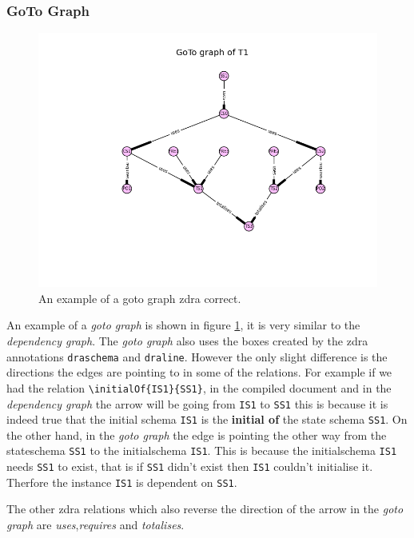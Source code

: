 \subsubsection{GoTo Graph}

\begin{figure}[H]
\centering
\includegraphics[scale=0.5]{Figures/zdra/gotograph.png}
\caption{An example of a goto graph \gls{zdra} correct. \label{fig:gotograph}}
\end{figure}

An example of a \emph{goto graph} is shown in figure \ref{fig:gotograph}, it is very similar to the \emph{dependency graph}. The \emph{goto graph} also uses the boxes created by the \gls{zdra} annotations \verb|draschema| and \verb|draline|. However the only slight difference is the directions the edges are pointing to in some of the relations. For example if we had the relation \verb|\initialOf{IS1}{SS1}|, in the compiled document and in the \emph{dependency graph} the arrow will be going from \verb|IS1| to \verb|SS1| this is because it is indeed true that the initial schema \verb|IS1| is the \textbf{initial of} the state schema \verb|SS1|. On the other hand, in the \emph{goto graph} the edge is pointing the other way from the stateschema \verb|SS1| to the initialschema \verb|IS1|. This is because the initialschema \verb|IS1| needs \verb|SS1| to exist, that is if \verb|SS1| didn't exist then \verb|IS1| couldn't initialise it. Therfore the instance \verb|IS1| is dependent on \verb|SS1|.

The other \gls{zdra} relations which also reverse the direction of the arrow in the \emph{goto graph} are \emph{uses},\emph{requires} and \emph{totalises}.

